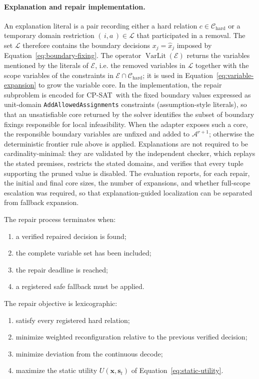 \documentclass[pdflatex,sn-mathphys-num,iicol,oneside]{sn-jnl}
\newcommand{\cpsat}{\textsc{CP-SAT}}
\begin{document}
\paragraph{Explanation and repair implementation.}
An explanation literal is a pair recording either a hard relation
$c\in\mathcal{C}_{\mathrm{hard}}$ or a temporary domain restriction
$(\,i,a\,)\in\mathcal{L}$ that participated in a removal. The set
$\mathcal{L}$ therefore contains the boundary decisions
$x_j=\widehat{x}_j$ imposed by Equation~\eqref{eq:boundary-fixing}.
The operator $\operatorname{VarLit}(\mathcal{E})$ returns the variables
mentioned by the literals of $\mathcal{E}$, i.e. the removed variables
in $\mathcal{L}$ together with the scope variables of the constraints
in $\mathcal{E}\cap\mathcal{C}_{\mathrm{hard}}$; it is used in
Equation~\eqref{eq:variable-expansion} to grow the variable core.
In the implementation, the repair subproblem is encoded for
\cpsat\ with the fixed boundary values expressed as unit-domain
\texttt{AddAllowedAssignments} constraints (assumption-style literals),
so that an unsatisfiable core returned by the solver identifies the
subset of boundary fixings responsible for local infeasibility. When
the adapter exposes such a core, the responsible boundary variables are
unfixed and added to $\mathcal{A}^{r+1}$; otherwise the deterministic
frontier rule above is applied. Explanations are not required to be
cardinality-minimal: they are validated by the independent checker,
which replays the stated premises, restricts the stated domains, and
verifies that every tuple supporting the pruned value is disabled.
The evaluation reports, for each repair, the initial and final core
sizes, the number of expansions, and whether full-scope escalation was
required, so that explanation-guided localization can be separated from
fallback expansion.

The repair process terminates when:

\begin{enumerate}
    \item a verified repaired decision is found;
    \item the complete variable set has been included;
    \item the repair deadline is reached;
    \item a registered safe fallback must be applied.
\end{enumerate}

The repair objective is lexicographic:

\begin{enumerate}
    \item satisfy every registered hard relation;
    \item minimize weighted reconfiguration relative to the previous
    verified decision;
    \item minimize deviation from the continuous decode;
    \item maximize the static utility $U(\bm{x},\bm{s}_t)$ of
    Equation~\eqref{eq:static-utility}.
\end{enumerate}
\end{document}
